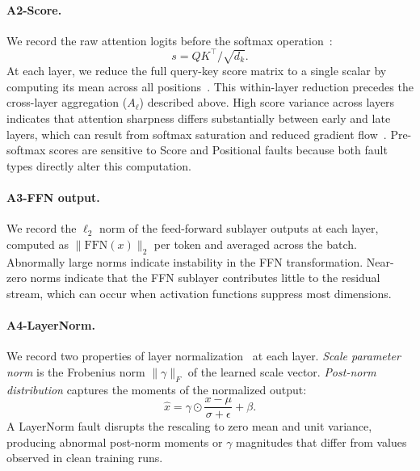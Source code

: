 \paragraph{A2-Score.} We record the raw attention logits before the softmax operation~\cite{vaswani2017attention}:
\begin{equation}
s = Q K^\top / \sqrt{d_k}.
\label{eq:score_stats}
\end{equation}
At each layer, we reduce the full query-key score matrix to a single scalar by computing its mean across all positions~\cite{dong2021attention}. This within-layer reduction precedes the cross-layer aggregation ($A_\ell$) described above. High score variance across layers indicates that attention sharpness differs substantially between early and late layers, which can result from softmax saturation and reduced gradient flow~\cite{dong2021attention,zhai2023stabilizing}. Pre-softmax scores are sensitive to Score and Positional faults because both fault types directly alter this computation.

\paragraph{A3-FFN output.} We record the $\ell_2$ norm of the feed-forward sublayer outputs at each layer, computed as $\|\text{FFN}(x)\|_2$ per token and averaged across the batch. Abnormally large norms indicate instability in the FFN transformation. Near-zero norms indicate that the FFN sublayer contributes little to the residual stream, which can occur when activation functions suppress most dimensions.

\paragraph{A4-LayerNorm.} We record two properties of layer normalization~\cite{ba2016layer} at each layer. \emph{Scale parameter norm} is the Frobenius norm $\|\gamma\|_F$ of the learned scale vector. \emph{Post-norm distribution} captures the moments of the normalized output:
\begin{equation}
\hat{x} = \gamma \odot \frac{x - \mu}{\sigma + \epsilon} + \beta.
\label{eq:layernorm}
\end{equation}
A LayerNorm fault disrupts the rescaling to zero mean and unit variance, producing abnormal post-norm moments or $\gamma$ magnitudes that differ from values observed in clean training runs.

